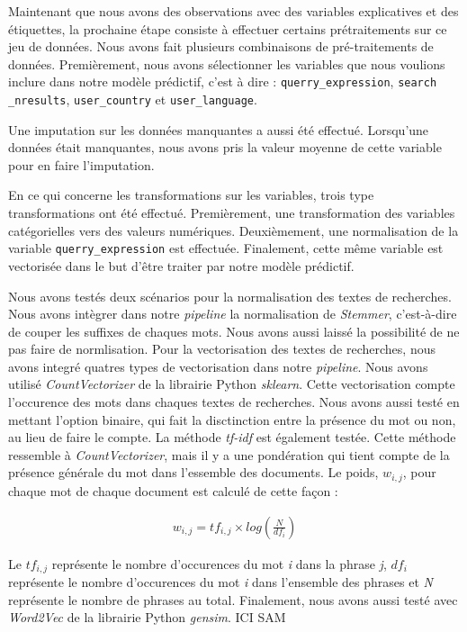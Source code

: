 Maintenant que nous avons des observations avec des variables explicatives et des étiquettes, la prochaine étape consiste à effectuer certains prétraitements sur ce jeu de données. Nous avons fait plusieurs combinaisons de pré-traitements de données. Premièrement, nous avons sélectionner les variables que nous voulions inclure dans notre modèle prédictif, c'est à dire : \texttt{querry\_expression}, \texttt{search \_nresults}, \texttt{user\_country} et \texttt{user\_language}.

Une imputation sur les données manquantes a aussi été effectué. Lorsqu'une données était manquantes, nous avons pris la valeur moyenne de cette variable pour en faire l'imputation.

En ce qui concerne les transformations sur les variables, trois type transformations ont été effectué. Premièrement, une transformation des variables catégorielles vers des valeurs numériques. Deuxièmement, une normalisation de la variable \texttt{querry\_expression} est effectuée. Finalement, cette même variable est vectorisée dans le but d'être traiter par notre modèle prédictif.

Nous avons testés deux scénarios pour la normalisation des textes de recherches. Nous avons intègrer dans notre \textit{pipeline} la normalisation de \textit{Stemmer}, c'est-à-dire de couper les suffixes de chaques mots. Nous avons aussi laissé la possibilité de ne pas faire de normlisation. Pour la vectorisation des textes de recherches, nous avons integré quatres types de vectorisation dans notre \textit{pipeline}. Nous avons utilisé \textit{CountVectorizer} de la librairie Python \textit{sklearn}. Cette vectorisation compte l'occurence des mots dans chaques textes de recherches. Nous avons aussi testé en mettant l'option binaire, qui fait la disctinction entre la présence du mot ou non, au lieu de faire le compte. La méthode \textit{tf-idf} est également testée. Cette méthode ressemble à \textit{CountVectorizer}, mais il y a une pondération qui tient compte de la présence générale du mot dans l'essemble des documents. Le poids, $w_{i,j}$, pour chaque mot  de chaque document est calculé de cette façon :

\begin{gather}
  w_{i,j} = tf_{i,j} \times log(\frac{N}{df_i})
\end{gather}

Le $tf_{i,j}$ représente le nombre d'occurences du mot \textit{i} dans la phrase \textit{j}, $df_i$ représente le nombre d'occurences du mot \textit{i} dans l'ensemble des phrases et \textit{N} représente le nombre de phrases au total. 
Finalement, nous avons aussi testé avec \textit{Word2Vec} de la librairie Python \textit{gensim}. ICI SAM


